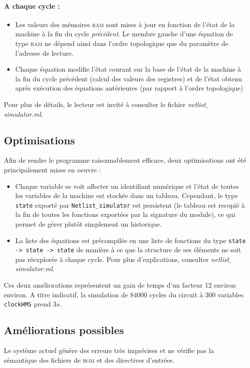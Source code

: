 \documentclass[11pt, a4paper]{article}
\newcommand{\prog}[1]{{\tt#1}}
\newcommand{\underscore}{$\_\,$}
\begin{document}
\paragraph{A chaque cycle :}
\begin{itemize}
\item Les valeurs des mémoires \textsc{ram} sont mises à jour en fonction de l'état de la machine à la fin du cycle \emph{précédent}. Le membre gauche d'une équation de type \textsc{ram} ne dépend ainsi dans l'ordre topologique que du paramètre de l'adresse de lecture.
\item Chaque équation modifie l'état courant sur la base de l'état de la machine à la fin du cycle précédent (calcul des valeurs des registres) et de l'état obtenu après exécution des équations antérieures (par rapport à l'ordre topologique)
\end{itemize}

\medskip

Pour plus de détails, le lecteur est invité à consulter le fichier \emph{netlist\underscore{}simulator.ml}.

\subsection{Optimisations}
Afin de rendre le programme raisonnablement efficace, deux optimisations ont été principalement mises en oeuvre :

\begin{itemize}
\item Chaque variable se voit affecter un identifiant numérique et l'état de toutes les variables de la machine est stockée dans un tableau. Cependant, le type \prog{state} exporté par \prog{Netlist\underscore{}simulator} est persistent (le tableau est recopié à la fin de toutes les fonctions exportées par la signature du module), ce qui permet de gérer plutôt simplement un historique.
\item La liste des équations est précompilée en une liste de fonctions du type \prog{state -> state -> state} de manière à ce que la structure de ses éléments ne soit pas réexplorée à chaque cycle. Pour plus d'explications, consulter \emph{netlist\underscore{}simulator.ml}.
\end{itemize}

\medskip

Ces deux améliorations représentent un gain de temps d'un facteur 12 environ environ. A titre indicatif, la simulation de $84000$ cycles du circuit à $300$ variables \prog{clockHMS} prend $3s$.

\subsection{Améliorations possibles}

Le système actuel génère des erreurs très imprécises et ne vérifie pas la sémantique des fichiers de \textsc{rom} et des directives d'entrées.
\end{document}
